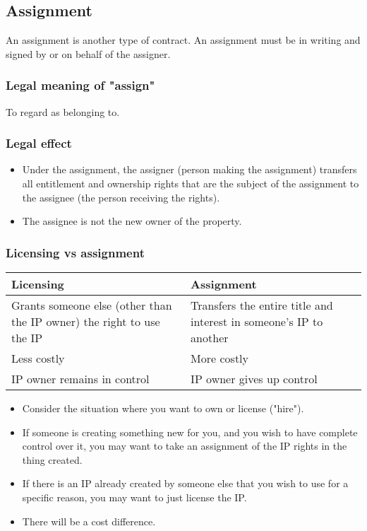 \documentclass[11pt]{article}
\begin{document}
\clearpage
\subsection{Assignment}
\label{sec:org6df0da7}
An assignment is another type of contract. An assignment must be in writing and signed by or on behalf of the assigner.
\subsubsection{Legal meaning of "assign"}
\label{sec:orga0f4b22}
To regard as belonging to.
\subsubsection{Legal effect}
\label{sec:org68d9162}
\begin{itemize}
\item Under the assignment, the assigner (person making the assignment) transfers all entitlement and ownership rights that are the subject of the assignment to the assignee (the person receiving the rights).
\item The assignee is not the new owner of the property.
\end{itemize}
\subsubsection{Licensing vs assignment}
\label{sec:org56e1bbb}
\begin{center}
\begin{tabular}{m{16em}|m{16em}}
Licensing & Assignment\\
\hline
Grants someone else (other than the IP owner) the right to use the IP & Transfers the entire title and interest in someone's IP to another\\
\hline
Less costly & More costly\\
\hline
IP owner remains in control & IP owner gives up control\\
\end{tabular}
\end{center}

\begin{itemize}
\item Consider the situation where you want to own or license ("hire").
\item If someone is creating something new for you, and you wish to have complete control over it, you may want to take an assignment of the IP rights in the thing created.
\item If there is an IP already created by someone else that you wish to use for a specific reason, you may want to just license the IP.
\item There will be a cost difference.
\end{itemize}
\end{document}
